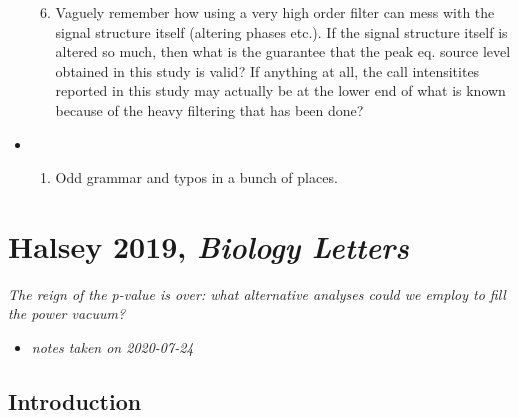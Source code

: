 \documentclass[
]{book}
\providecommand{\tightlist}{%
  \setlength{\itemsep}{0pt}\setlength{\parskip}{0pt}}
\begin{document}
\begin{itemize}
\begin{enumerate}
  \setcounter{enumi}{5}
  \tightlist
  \item
    Vaguely remember how using a very high order filter can mess with the signal structure itself (altering phases etc.). If the signal structure itself is altered so much, then what is the guarantee that the peak eq. source level obtained in this study is valid? If anything at all, the call intensitites reported in this study may actually be at the lower end of what is known because of the heavy filtering that has been done?
  \end{enumerate}
\item
  \begin{enumerate}
  \def\labelenumi{\arabic{enumi}.}
  \setcounter{enumi}{6}
  \tightlist
  \item
    Odd grammar and typos in a bunch of places.
  \end{enumerate}
\end{itemize}

\hypertarget{halsey-2019-biology-letters}{%
\chapter{\texorpdfstring{Halsey 2019, \emph{Biology Letters}}{Halsey 2019, Biology Letters}}\label{halsey-2019-biology-letters}}


\emph{The reign of the p-value is over: what alternative analyses could we employ to fill the power vacuum?} \citep{halsey2019a}

\begin{itemize}
\tightlist
\item
  \emph{notes taken on 2020-07-24}
\end{itemize}

\hypertarget{introduction}{%
\section{Introduction}\label{introduction}}
\end{document}
